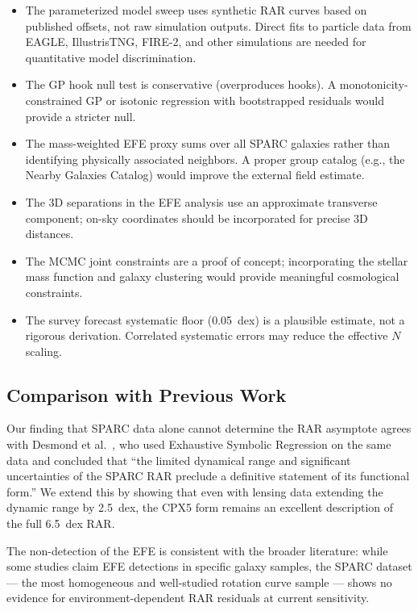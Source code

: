 \documentclass[twocolumn]{aastex631}
\begin{document}
\begin{itemize}
\item The parameterized model sweep uses synthetic RAR curves based on
      published offsets, not raw simulation outputs.  Direct fits to
      particle data from EAGLE, IllustrisTNG, FIRE-2, and other
      simulations are needed for quantitative model discrimination.
\item The GP hook null test is conservative (overproduces hooks).
      A monotonicity-constrained GP or isotonic regression with
      bootstrapped residuals would provide a stricter null.
\item The mass-weighted EFE proxy sums over all SPARC galaxies rather
      than identifying physically associated neighbors.  A proper group
      catalog (e.g., the Nearby Galaxies Catalog) would improve the
      external field estimate.
\item The 3D separations in the EFE analysis use an approximate
      transverse component; on-sky coordinates should be incorporated
      for precise 3D distances.
\item The MCMC joint constraints are a proof of concept; incorporating
      the stellar mass function and galaxy clustering would provide
      meaningful cosmological constraints.
\item The survey forecast systematic floor (0.05~dex) is a plausible
      estimate, not a rigorous derivation.  Correlated systematic errors
      may reduce the effective $N$ scaling.
\end{itemize}

\subsection{Comparison with Previous Work}

Our finding that SPARC data alone cannot determine the RAR asymptote
agrees with Desmond et al.~\cite{desmond2023}, who used Exhaustive
Symbolic Regression on the same data and concluded that ``the limited
dynamical range and significant uncertainties of the SPARC RAR preclude
a definitive statement of its functional form.''  We extend this by
showing that even with lensing data extending the dynamic range by
2.5~dex, the CPX5 form remains an excellent description of the full
6.5~dex RAR.

The non-detection of the EFE is consistent with the broader literature:
while some studies claim EFE detections in specific galaxy samples, the
SPARC dataset --- the most homogeneous and well-studied rotation curve
sample --- shows no evidence for environment-dependent RAR residuals at
current sensitivity.
\end{document}

